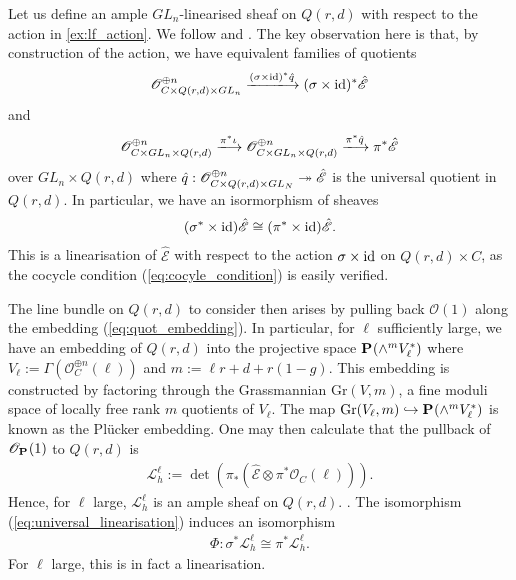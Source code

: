 \documentclass[12pt]{ociamthesis}  %
\begin{document}
\begin{example}
  Let us define an ample $GL_n$-linearised sheaf on
  $Q(r,d)$ with respect to the action in \ref{ex:lf_action}. We follow
  \cite[75-76]{hoskins2016} and \cite[90]{huybrechts2010}.
  The key observation
  here is that, by construction of the action, we have equivalent
  families of quotients
  \begin{align*}
    \mathscr O^{\oplus n}_{C\times Q(r,d)\times GL_n}
    \xlongrightarrow{(\sigma\times\identity)^* \hat q}
    (\sigma\times\identity)^* \hat{\mathscr E}
  \end{align*}
  and
  \begin{align*}
    \mathscr O^{\oplus n}_{C\times GL_n\times Q(r,d)}
    \xlongrightarrow{\pi^*\iota}
    \mathscr O^{\oplus n}_{C\times GL_n\times Q(r,d)}
    \xlongrightarrow{\pi^*\hat q}
    \pi^*\hat{\mathscr E}
  \end{align*}
  over $GL_n\times Q(r,d)$ where
  $\hat q : \mathscr O^{\oplus n}_{C\times Q(r,d)\times GL_N} \twoheadrightarrow \hat{\mathscr E}$
  is the universal quotient in $Q(r,d)$. In particular, we have
  an isormorphism of sheaves
  \begin{align}\label{eq:universal_linearisation}
    (\sigma^*\times\operatorname{id})\hat{\mathscr E} \cong (\pi^*\times\operatorname{id})\hat{\mathscr E}.
  \end{align}
  This is a linearisation of $\hat{\mathscr E}$ with respect to
  the action $\sigma\times\operatorname{id}$ on $Q(r,d)\times C$, as the
  cocycle condition (\ref{eq:cocyle_condition}) is easily verified.

  The line bundle on $Q(r,d)$ to consider then arises
  by pulling back $\mathscr O(1)$ along the embedding (\ref{eq:quot_embedding}).
  In particular, for $\ell$ sufficiently large, we have an
  embedding of $Q(r,d)$ into the projective space
  $\mathbf{P}^{}_{}(\wedge^m V_\ell^*)$
  where $V_\ell:=\Gamma(\mathscr O^{\oplus n}_C(\ell))$ and $m := \ell r+d+r(1-g)$.
  This embedding is constructed by factoring through the Grassmannian
  $\text{Gr}(V,m)$, a fine moduli space of locally free rank $m$ quotients of
  $V_\ell$.  The map $\text{Gr}(V_\ell,m)\hookrightarrow\mathbf{P}^{}_{}(\wedge^m V_\ell^*)$ is known as the Pl\"ucker
  embedding.  One may then calculate that the pullback of $\mathscr
    O_{\mathbf{P}^{}_{}}(1)$ to $Q(r,d)$ is
  \begin{align*}
    \mathscr L^\ell_h
    := \det(\pi_*(\hat{\mathscr E} \otimes \pi^*\mathscr O_C(\ell))).
  \end{align*}
  Hence, for $\ell$ large, $\mathscr L^\ell_h$ is an ample sheaf
  on $Q(r,d)$. \cite[Proposition 2.2.5]{huybrechts2010}.
  The isomorphism (\ref{eq:universal_linearisation}) induces an isomorphism
  \begin{align*}
    \Phi:\sigma^*\mathscr L^\ell_h \cong \pi^*\mathscr L^\ell_h.
  \end{align*}
  For $\ell$ large, this is in fact a linearisation.
\end{example}
\end{document}
